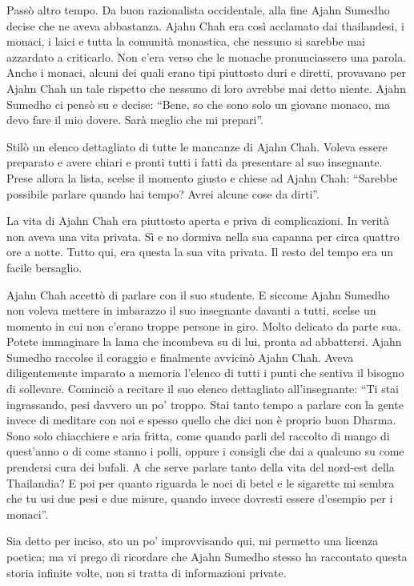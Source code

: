 Passò altro tempo. Da buon razionalista occidentale, alla fine Ajahn Sumedho decise che ne aveva abbastanza. Ajahn Chah era così acclamato dai thailandesi, i monaci, i laici e tutta la comunità monastica, che nessuno si sarebbe mai azzardato a criticarlo. Non c'era verso che le monache pronunciassero una parola. Anche i monaci, alcuni dei quali erano tipi piuttosto duri e diretti, provavano per Ajahn Chah un tale rispetto che nessuno di loro avrebbe mai detto niente. Ajahn Sumedho ci pensò su e decise: ``Bene, so che sono solo un giovane monaco, ma devo fare il mio dovere. Sarà meglio che mi prepari''.

Stilò un elenco dettagliato di tutte le mancanze di Ajahn Chah. Voleva essere preparato e avere chiari e pronti tutti i fatti da presentare al suo insegnante. Prese allora la lista, scelse il momento giusto e chiese ad Ajahn Chah: ``Sarebbe possibile parlare quando hai tempo? Avrei alcune cose da dirti''.

La vita di Ajahn Chah era piuttosto aperta e priva di complicazioni. In verità non aveva una vita privata. Sì e no dormiva nella sua capanna per circa quattro ore a notte. Tutto qui, era questa la sua vita privata. Il resto del tempo era un facile bersaglio.

Ajahn Chah accettò di parlare con il suo studente. E siccome Ajahn Sumedho non voleva mettere in imbarazzo il suo insegnante davanti a tutti, scelse un momento in cui non c'erano troppe persone in giro. Molto delicato da parte sua. Potete immaginare la lama che incombeva su di lui, pronta ad abbattersi. Ajahn Sumedho raccolse il coraggio e finalmente avvicinò Ajahn Chah. Aveva diligentemente imparato a memoria l'elenco di tutti i punti che sentiva il bisogno di sollevare. Cominciò a recitare il suo elenco dettagliato all'insegnante: ``Ti stai ingrassando, pesi davvero un po' troppo. Stai tanto tempo a parlare con la gente invece di meditare con noi e spesso quello che dici non è proprio buon Dharma. Sono solo chiacchiere e aria fritta, come quando parli del raccolto di mango di quest'anno o di come stanno i polli, oppure i consigli che dai a qualcuno su come prendersi cura dei bufali. A che serve parlare tanto della vita del nord-est della Thailandia? E poi per quanto riguarda le noci di betel e le sigarette mi sembra che tu usi due pesi e due misure, quando invece dovresti essere d'esempio per i monaci''.

Sia detto per inciso, sto un po' improvvisando qui, mi permetto una licenza poetica; ma vi prego di ricordare che Ajahn Sumedho stesso ha raccontato questa storia infinite volte, non si tratta di informazioni private. 

